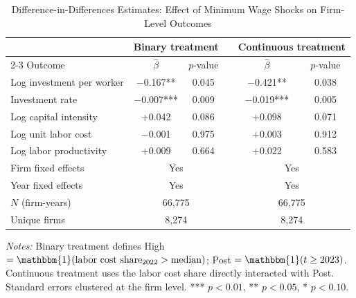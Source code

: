 \documentclass[5p,times,authoryear]{elsarticle}
\begin{document}
\begin{table}[htbp]
\centering
\begin{threeparttable}
\caption{Difference-in-Differences Estimates: Effect of Minimum Wage Shocks on Firm-Level Outcomes}
\label{tab:did_main}
\small
\setlength{\tabcolsep}{5pt}
\begin{tabular}{@{}lccccc@{}}
\toprule
& \multicolumn{2}{c}{Binary treatment} & & \multicolumn{2}{c}{Continuous treatment} \\
\cmidrule{2-3} \cmidrule{5-6}
Outcome & $\hat{\beta}$ & $p$-value & & $\hat{\beta}$ & $p$-value \\
\midrule
Log investment per worker & $-$0.167** & 0.045 & & $-$0.421** & 0.038 \\
Investment rate & $-$0.007*** & 0.009 & & $-$0.019*** & 0.005 \\
Log capital intensity & +0.042 & 0.086 & & +0.098 & 0.071 \\
Log unit labor cost & $-$0.001 & 0.975 & & +0.003 & 0.912 \\
Log labor productivity & +0.009 & 0.664 & & +0.022 & 0.583 \\
\midrule
Firm fixed effects & \multicolumn{2}{c}{Yes} & & \multicolumn{2}{c}{Yes} \\
Year fixed effects & \multicolumn{2}{c}{Yes} & & \multicolumn{2}{c}{Yes} \\
$N$ (firm-years) & \multicolumn{2}{c}{66,775} & & \multicolumn{2}{c}{66,775} \\
Unique firms & \multicolumn{2}{c}{8,274} & & \multicolumn{2}{c}{8,274} \\
\bottomrule
\end{tabular}
\begin{tablenotes}
\footnotesize
\item \textit{Notes:} Binary treatment defines High $= \mathbbm{1}(\text{labor cost share}_{2022} > \text{median})$; Post $= \mathbbm{1}(t \geq 2023)$. Continuous treatment uses the labor cost share directly interacted with Post. Standard errors clustered at the firm level. *** $p<0.01$, ** $p<0.05$, * $p<0.10$.
\end{tablenotes}
\end{threeparttable}
\end{table}
\end{document}
